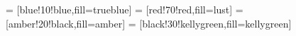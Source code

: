 

 = [blue!10!blue,fill=trueblue]
 = [red!70!red,fill=lust]
 = [amber!20!black,fill=amber]
 = [black!30!kellygreen,fill=kellygreen]

